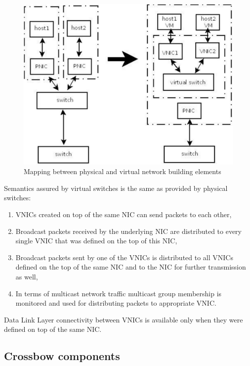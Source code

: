 \documentclass[11pt]{book}
\begin{document}
        \begin{figure}[H]
          \begin{center}
            \includegraphics[width=.7\textwidth]{img/physical_and_virtual_switches_mapping.pdf}
          \end{center}

          \caption{Mapping between physical and virtual network building elements}
        \end{figure}
        
        Semantics assured by virtual switches is the same as provided by physical switches: 

        \begin{enumerate}
          \item VNICs created on top of the same NIC can send packets to each other,
          \item Broadcast packets received by the underlying NIC are distributed to every single VNIC that was defined
                on the top of this NIC,
          \item Broadcast packets sent by one of the VNICs is distributed to all VNICs defined on the top of the same
                NIC and to the NIC for further transmission as well,
          \item In terms of multicast network traffic multicast group membership is monitored and used for distributing
                packets to appropriate VNIC.
        \end{enumerate}

        Data Link Layer connectivity between VNICs is available only when they were defined on top of the same NIC. 

	
      \subsection{Crossbow components}
\end{document}
